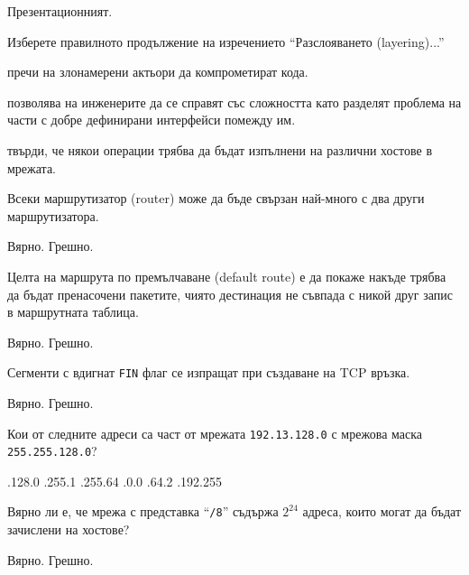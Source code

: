 \begin{questions}
\begin{oneparchoices}
    \choice Презентационният.
  \end{oneparchoices}

  \question[6] Изберете правилното продължение на изречението "`Разслояването
  (\foreignlanguage{english}{layering})..."'
  \begin{choices}
    \choice пречи на злонамерени актьори да компрометират кода.

    \choice позволява на инженерите да се справят със сложността като
    разделят проблема на части с добре дефинирани интерфейси помежду им.

    \choice твърди, че някои операции трябва да бъдат изпълнени на различни
    хостове в мрежата.
  \end{choices}

  \question[6] Всеки маршрутизатор (\foreignlanguage{english}{router}) може да
  бъде свързан най-много с два други маршрутизатора.
  \begin{oneparchoices}
    \choice Вярно.
    \CorrectChoice Грешно.
  \end{oneparchoices}

  \question[6] Целта на маршрута по премълчаване
  (\foreignlanguage{english}{default route}) е да покаже накъде трябва да бъдат
  пренасочени пакетите, чиято дестинация не съвпада с никой друг запис в
  маршрутната таблица.
  \begin{oneparchoices}
    \CorrectChoice Вярно.
    \choice Грешно.
  \end{oneparchoices}

  \question[6] Сегменти с вдигнат \texttt{FIN} флаг се изпращат при създаване на
  TCP връзка.
  \begin{oneparchoices}
    \choice Вярно.
    \CorrectChoice Грешно.
  \end{oneparchoices}

  \question[6] Кои от следните адреси са част от мрежата \texttt{192.13.128.0} с
  мрежова маска \texttt{255.255.128.0}?
  \begin{choices}
    .128.0
    .255.1
    .255.64
    .0.0
    .64.2
    .192.255
  \end{choices}

  \question[6] Вярно ли е, че мрежа с представка "`\texttt{/8}"' съдържа
  $2^{24}$ адреса, които могат да бъдат зачислени на хостове?
  \begin{oneparchoices}
    \choice Вярно.
    \CorrectChoice Грешно.
  \end{oneparchoices}



\end{questions}
